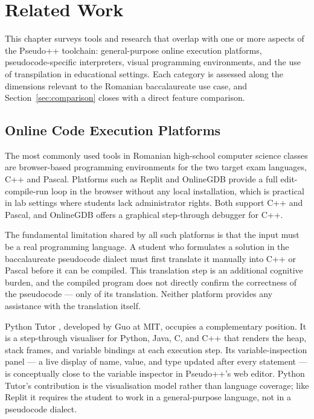 \chapter{Related Work}
\label{chap:related}

This chapter surveys tools and research that overlap with one or more
aspects of the Pseudo++ toolchain: general-purpose online execution
platforms, pseudocode-specific interpreters, visual programming
environments, and the use of transpilation in educational settings.
Each category is assessed along the dimensions relevant to the Romanian
baccalaureate use case, and Section~\ref{sec:comparison} closes with a
direct feature comparison.

\section{Online Code Execution Platforms}
\label{sec:online-editors}

The most commonly used tools in Romanian high-school computer science
classes are browser-based programming environments for the two target exam languages,
C++ and Pascal.  Platforms such as Replit \cite{replit} and OnlineGDB
\cite{onlinegdb} provide a full edit-compile-run loop in the browser
without any local installation, which is practical in lab settings where
students lack administrator rights.  Both support C++ and Pascal, and
OnlineGDB offers a graphical step-through debugger for C++.

The fundamental limitation shared by all such platforms is that the
input must be a real programming language.  A student who formulates a
solution in the baccalaureate pseudocode dialect must first translate it
manually into C++ or Pascal before it can be compiled.  This translation
step is an additional cognitive burden, and the compiled program does not
directly confirm the correctness of the pseudocode --- only of its
translation.  Neither platform provides any assistance with the
translation itself.

Python Tutor \cite{pythontutor}, developed by Guo at MIT, occupies a
complementary position.  It is a step-through visualiser for Python,
Java, C, and C++ that renders the heap, stack frames, and variable
bindings at each execution step.  Its variable-inspection panel --- a
live display of name, value, and type updated after every statement ---
is conceptually close to the variable inspector in Pseudo++'s web
editor.  Python Tutor's contribution is the visualisation model rather
than language coverage; like Replit it requires the student to work in a
general-purpose language, not in a pseudocode dialect.


